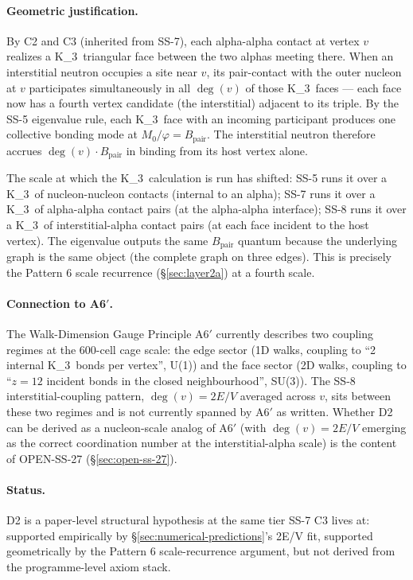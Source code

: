 \documentclass[11pt,letterpaper]{article}
\theoremstyle{definition}
\newcommand{\Mzero}{M_0}
\newcommand{\phig}{\varphi}
\newcommand{\Bpair}{B_{\text{pair}}}
\newcommand{\Kthree}{K_3}
\newcommand{\degv}{\deg(v)}
\begin{document}
\paragraph{Geometric justification.} By C2 and C3 (inherited from SS-7), each alpha-alpha contact at vertex $v$ realizes a \Kthree\ triangular face between the two alphas meeting there. When an interstitial neutron occupies a site near $v$, its pair-contact with the outer nucleon at $v$ participates simultaneously in all $\degv$ of those \Kthree\ faces --- each face now has a fourth vertex candidate (the interstitial) adjacent to its triple. By the SS-5 eigenvalue rule, each \Kthree\ face with an incoming participant produces one collective bonding mode at $\Mzero/\phig = \Bpair$. The interstitial neutron therefore accrues $\degv \cdot \Bpair$ in binding from its host vertex alone.

The scale at which the \Kthree\ calculation is run has shifted: SS-5 runs it over a \Kthree\ of nucleon-nucleon contacts (internal to an alpha); SS-7 runs it over a \Kthree\ of alpha-alpha contact pairs (at the alpha-alpha interface); SS-8 runs it over a \Kthree\ of interstitial-alpha contact pairs (at each face incident to the host vertex). The eigenvalue outputs the same $\Bpair$ quantum because the underlying graph is the same object (the complete graph on three edges). This is precisely the Pattern 6 scale recurrence (\S\ref{sec:layer2a}) at a fourth scale.

\paragraph{Connection to A6$'$.} The Walk-Dimension Gauge Principle A6$'$ currently describes two coupling regimes at the 600-cell cage scale: the edge sector (1D walks, coupling to ``2 internal \Kthree\ bonds per vertex'', U(1)) and the face sector (2D walks, coupling to ``$z = 12$ incident bonds in the closed neighbourhood'', SU(3)). The SS-8 interstitial-coupling pattern, $\degv = 2E/V$ averaged across $v$, sits between these two regimes and is not currently spanned by A6$'$ as written. Whether D2 can be derived as a nucleon-scale analog of A6$'$ (with $\degv = 2E/V$ emerging as the correct coordination number at the interstitial-alpha scale) is the content of OPEN-SS-27 (\S\ref{sec:open-ss-27}).

\paragraph{Status.} D2 is a paper-level structural hypothesis at the same tier SS-7 C3 lives at: supported empirically by \S\ref{sec:numerical-predictions}'s 2E/V fit, supported geometrically by the Pattern 6 scale-recurrence argument, but not derived from the programme-level axiom stack.
\end{document}
